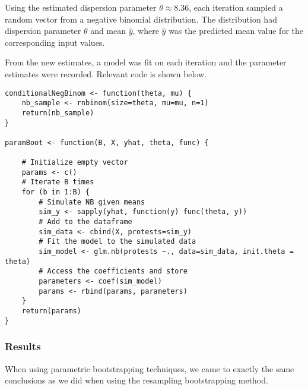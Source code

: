 \documentclass[12pt]{article}
\begin{document}
Using the estimated dispersion parameter $\theta \approx 8.36$, each iteration sampled a random vector from a negative binomial distribution. The distribution had dispersion parameter $\theta$ and mean $\hat y$, where $\hat y$ was the predicted mean value for the corresponding input values.

From the new estimates, a model was fit on each iteration and the parameter estimates were recorded. Relevant code is shown below.

\begin{lstlisting}
conditionalNegBinom <- function(theta, mu) {
    nb_sample <- rnbinom(size=theta, mu=mu, n=1)
    return(nb_sample)
}

paramBoot <- function(B, X, yhat, theta, func) {

    # Initialize empty vector
    params <- c()
    # Iterate B times
    for (b in 1:B) {
        # Simulate NB given means
        sim_y <- sapply(yhat, function(y) func(theta, y))
        # Add to the dataframe
        sim_data <- cbind(X, protests=sim_y)
        # Fit the model to the simulated data
        sim_model <- glm.nb(protests ~., data=sim_data, init.theta = theta)
        # Access the coefficients and store
        parameters <- coef(sim_model)
        params <- rbind(params, parameters)
    }
    return(params)
}
\end{lstlisting}
\subsubsection*{Results}
When using parametric bootstrapping techniques, we came to exactly the same conclusions as we did when using the resampling bootstrapping method.
\end{document}
